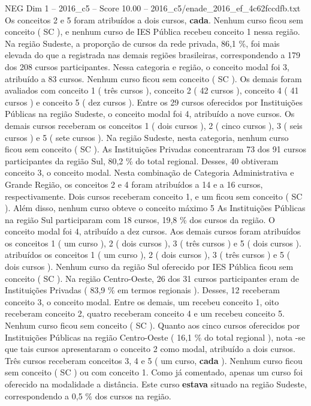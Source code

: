 \begin{textsample}{NEG Dim 1 – 2016\_c5 – Score 10.00 – 2016\_c5/enade\_2016\_ef\_4c62fccdfb.txt}
Os conceitos 2 e 5 foram atribuídos a dois cursos, \textbf{cada}.
Nenhum curso ficou sem conceito ( SC ), e nenhum curso de IES Pública recebeu conceito 1 nessa região.
Na região Sudeste, a proporção de cursos da rede privada, 86,1 \%, foi mais elevada do que a registrada nas demais regiões brasileiras, correspondendo a 179 dos 208 cursos participantes.
Nessa categoria e região, o conceito modal foi 3, atribuído a 83 cursos.
Nenhum curso ficou sem conceito ( SC ).
Os demais foram avaliados com conceito 1 ( três cursos ), conceito 2 ( 42 cursos ), conceito 4 ( 41 cursos ) e conceito 5 ( dez cursos ).
Entre os 29 cursos oferecidos por Instituições Públicas na região Sudeste, o conceito modal foi 4, atribuído a nove cursos.
Os demais cursos receberam os conceitos 1 ( dois cursos ), 2 ( cinco cursos ), 3 ( seis cursos ) e 5 ( sete cursos ).
Na região Sudeste, nesta categoria, nenhum curso ficou sem conceito ( SC ).
As Instituições Privadas concentraram 73 dos 91 cursos participantes da região Sul, 80,2 \% do total regional.
Desses, 40 obtiveram conceito 3, o conceito modal.
Nesta combinação de Categoria Administrativa e Grande Região, os conceitos 2 e 4 foram atribuídos a 14 e a 16 cursos, respectivamente.
Dois cursos receberam conceito 1, e um ficou sem conceito ( SC ).
Além disso, nenhum curso obteve o conceito máximo 5 As Instituições Públicas na região Sul participaram com 18 cursos, 19,8 \% dos cursos da região.
O conceito modal foi 4, atribuído a dez cursos.
Aos demais cursos foram atribuídos os conceitos 1 ( um curso ), 2 ( dois cursos ), 3 ( três cursos ) e 5 ( dois cursos ). atribuídos os conceitos 1 ( um curso ), 2 ( dois cursos ), 3 ( três cursos ) e 5 ( dois cursos ).
Nenhum curso da região Sul oferecido por IES Pública ficou sem conceito ( SC ).
Na região Centro-Oeste, 26 dos 31 cursos participantes eram de Instituições Privadas ( 83,9 \% em termos regionais ).
Desses, 12 receberam conceito 3, o conceito modal.
Entre os demais, um recebeu conceito 1, oito receberam conceito 2, quatro receberam conceito 4 e um recebeu conceito 5.
Nenhum curso ficou sem conceito ( SC ).
Quanto aos cinco cursos oferecidos por Instituições Públicas na região Centro-Oeste ( 16,1 \% do total regional ), nota -se que tais cursos apresentaram o conceito 2 como modal, atribuído a dois cursos.
Três cursos receberam conceitos 3, 4 e 5 ( um curso, \textbf{cada} ).
Nenhum curso ficou sem conceito ( SC ) ou com conceito 1.
Como já comentado, apenas um curso foi oferecido na modalidade a distância.
Este curso \textbf{estava} situado na região Sudeste, correspondendo a 0,5 \% dos cursos na região.

\end{textsample}
